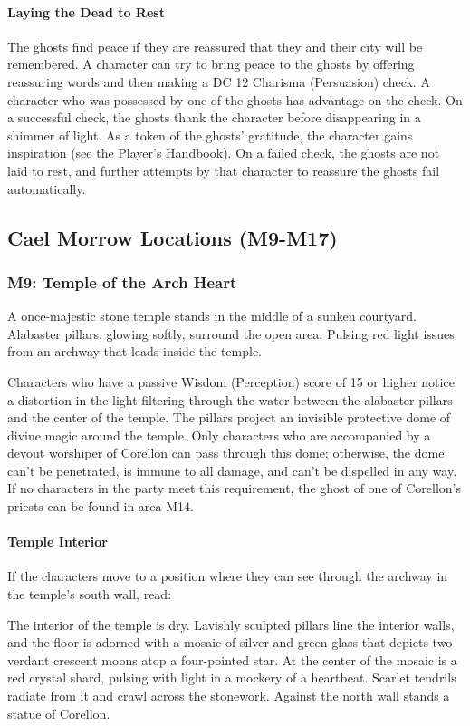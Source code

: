 \documentclass[10pt,a4,twoside,twocolumn,openany,nodeprecatedcode]{dndbook}
\begin{document}
\paragraph{Laying the Dead to Rest}
The ghosts find peace if they are reassured that they and their city will be remembered. A character can try to bring peace to the ghosts by offering reassuring words and then making a DC 12 Charisma (Persuasion) check. A character who was possessed by one of the ghosts has advantage on the check. On a successful check, the ghosts thank the character before disappearing in a shimmer of light. As a token of the ghosts' gratitude, the character gains inspiration (see the Player's Handbook). On a failed check, the ghosts are not laid to rest, and further attempts by that character to reassure the ghosts fail automatically.
\subsection{Cael Morrow Locations (M9-M17)}
\subsubsection{M9: Temple of the Arch Heart}
\begin{DndReadAloud}{}
A once-majestic stone temple stands in the middle of a sunken courtyard. Alabaster pillars, glowing softly, surround the open area. Pulsing red light issues from an archway that leads inside the temple.
\end{DndReadAloud}

Characters who have a passive Wisdom (Perception) score of 15 or higher notice a distortion in the light filtering through the water between the alabaster pillars and the center of the temple. The pillars project an invisible protective dome of divine magic around the temple. Only characters who are accompanied by a devout worshiper of Corellon can pass through this dome; otherwise, the dome can't be penetrated, is immune to all damage, and can't be dispelled in any way. If no characters in the party meet this requirement, the ghost of one of Corellon's priests can be found in area M14.
\paragraph{Temple Interior}
If the characters move to a position where they can see through the archway in the temple's south wall, read:
\begin{DndReadAloud}{}
The interior of the temple is dry. Lavishly sculpted pillars line the interior walls, and the floor is adorned with a mosaic of silver and green glass that depicts two verdant crescent moons atop a four-pointed star. At the center of the mosaic is a red crystal shard, pulsing with light in a mockery of a heartbeat. Scarlet tendrils radiate from it and crawl across the stonework. Against the north wall stands a statue of Corellon.
\end{DndReadAloud}
\end{document}
